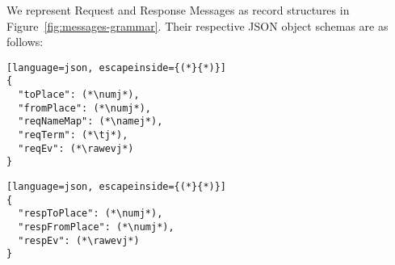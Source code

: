 


We represent Request and Response Messages as record structures in Figure~\ref{fig:messages-grammar}.  Their respective JSON object schemas are as follows: \\


\begin{lstlisting}[language=json, escapeinside={(*}{*)}]
{
  "toPlace": (*\numj*),
  "fromPlace": (*\numj*),
  "reqNameMap": (*\namej*),
  "reqTerm": (*\tj*),
  "reqEv": (*\rawevj*)
}
\end{lstlisting}

\newpage

\begin{lstlisting}[language=json, escapeinside={(*}{*)}]
{
  "respToPlace": (*\numj*),
  "respFromPlace": (*\numj*),
  "respEv": (*\rawevj*)
}
\end{lstlisting}


\vspace{2mm}

